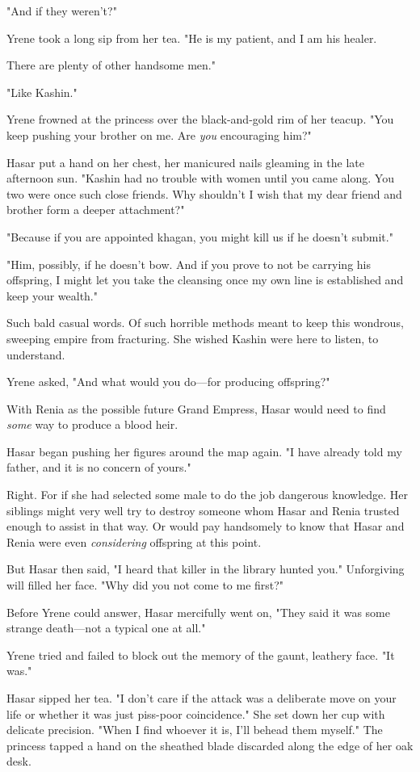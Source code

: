 "And if they weren't?"

Yrene took a long sip from her tea. "He is my patient, and I am his healer.

There are plenty of other handsome men."

"Like Kashin."

Yrene frowned at the princess over the black-and-gold rim of her teacup. "You keep pushing your brother on me. Are \emph{you} encouraging him?"

Hasar put a hand on her chest, her manicured nails gleaming in the late afternoon sun. "Kashin had no trouble with women until you came along. You two were once such close friends. Why shouldn't I wish that my dear friend and brother form a deeper attachment?"

"Because if you are appointed khagan, you might kill us if he doesn't submit."

"Him, possibly, if he doesn't bow. And if you prove to not be carrying his offspring, I might let you take the cleansing once my own line is established and keep your wealth."

Such bald casual words. Of such horrible methods meant to keep this wondrous, sweeping empire from fracturing. She wished Kashin were here to listen, to understand.

Yrene asked, "And what would you do---for producing offspring?"

With Renia as the possible future Grand Empress, Hasar would need to find \emph{some} way to produce a blood heir.

Hasar began pushing her figures around the map again. "I have already told my father, and it is no concern of yours."

Right. For if she had selected some male to do the job 
dangerous knowledge. Her siblings might very well try to destroy someone whom Hasar and Renia trusted enough to assist in that way. Or would pay handsomely to know that Hasar and Renia were even \emph{considering}
offspring at this point.

But Hasar then said, "I heard that killer in the library hunted you." Unforgiving will filled her face. "Why did you not come to me first?"

Before Yrene could answer, Hasar mercifully went on, "They said it was some strange death---not a typical one at all."

Yrene tried and failed to block out the memory of the gaunt, leathery face. "It was."

Hasar sipped her tea. "I don't care if the attack was a deliberate move on your life or whether it was just piss-poor coincidence." She set down her cup with delicate precision. "When I find whoever it is, I'll behead them myself." The princess tapped a hand on the sheathed blade discarded along the edge of her oak desk.

